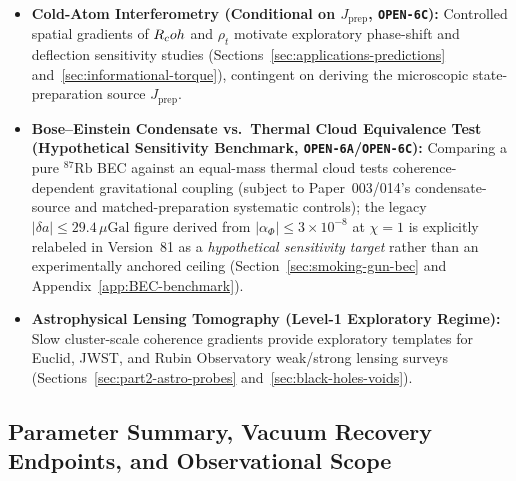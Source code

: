 \begin{itemize}
  \item \textbf{Cold-Atom Interferometry (Conditional on $J_{\mathrm{prep}}$, \texttt{OPEN-6C}):} Controlled spatial gradients of $R_coh$ and $\rho_t$ motivate exploratory phase-shift and deflection sensitivity studies (Sections~\ref{sec:applications-predictions} and~\ref{sec:informational-torque}), contingent on deriving the microscopic state-preparation source $J_{\mathrm{prep}}$.
  \item \textbf{Bose--Einstein Condensate vs.\ Thermal Cloud Equivalence Test (Hypothetical Sensitivity Benchmark, \texttt{OPEN-6A}/\texttt{OPEN-6C}):} Comparing a pure $^{87}\mathrm{Rb}$ BEC against an equal-mass thermal cloud tests coherence-dependent gravitational coupling (subject to Paper~003/014's condensate-source and matched-preparation systematic controls); the legacy $|\delta a| \le 29.4\,\mu\mathrm{Gal}$ figure derived from $|\alpha_\Phi| \le 3\times 10^{-8}$ at $\chi = 1$ is explicitly relabeled in Version~81 as a \emph{hypothetical sensitivity target} rather than an experimentally anchored ceiling (Section~\ref{sec:smoking-gun-bec} and Appendix~\ref{app:BEC-benchmark}).
  \item \textbf{Astrophysical Lensing Tomography (Level-1 Exploratory Regime):} Slow cluster-scale coherence gradients provide exploratory templates for Euclid, JWST, and Rubin Observatory weak/strong lensing surveys (Sections~\ref{sec:part2-astro-probes} and~\ref{sec:black-holes-voids}).
\end{itemize}

\subsection{Parameter Summary, Vacuum Recovery Endpoints, and Observational Scope}

